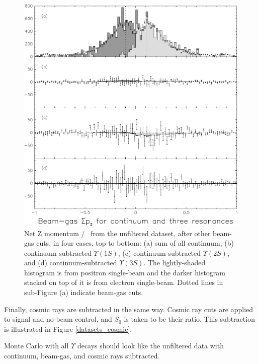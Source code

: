 \begin{figure}[p]
  \begin{center}
    \includegraphics[width=\linewidth]{plots/datasets_beamgas}
  \end{center}
  \caption{\label{datasets_beamgas} Net Z momentum / \ebeam\ from the
    unfiltered dataset, after other beam-gas cuts, in four cases, top
    to bottom: (a) sum of all continuum, (b) continuum-subtracted
    $\Upsilon(1S)$, (c) continuum-subtracted $\Upsilon(2S)$, and (d)
    continuum-subtracted $\Upsilon(3S)$.  The lightly-shaded histogram
    is from positron single-beam and the darker histogram stacked on
    top of it is from electron single-beam.  Dotted lines in
    sub-Figure (a) indicate beam-gas cuts.}
\end{figure}

Finally, cosmic rays are subtracted in the same way.  Cosmic ray cuts
are applied to signal and no-beam control, and $S_0$ is taken to be
their ratio.  This subtraction is illustrated in Figure
\ref{datasets_cosmic}.

Monte Carlo with all $\Upsilon$ decays should look like the unfiltered
data with continuum, beam-gas, and cosmic rays subtracted.

